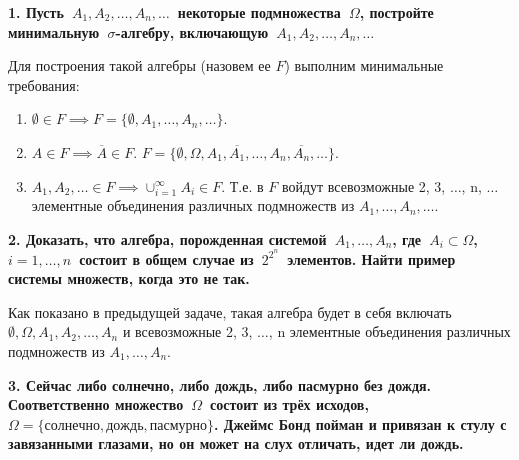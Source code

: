 \documentclass{article}
\begin{document}
\noindent \textbf{1. Пусть $A_1, A_2, \dots, A_n, \dots$ некоторые подмножества $\Omega$, постройте минимальную $\sigma$-алгебру, включающую $A_1, A_2, …, A_n, …$}

Для построения такой алгебры (назовем ее $F$) выполним минимальные требования:

\begin{enumerate}
\item $\emptyset \in F \implies F = \{\emptyset, A_1, \dots, A_n, \dots\}$. 

\item $A \in F \implies \overline{A} \in F$. $F = \{\emptyset, \Omega, A_1, \overline{A_1}, \dots, A_n, \overline{A_n}, \dots\}$. 

\item $A_1, A_2, \dots \in F \implies \cup_{i=1}^{\infty}A_i \in F$. Т.е. в $F$ войдут всевозможные 2, 3, $\dots$, n, $\dots$ элементные объединения различных подмножеств из $A_1, \dots, A_n, \dots$.
\end{enumerate}

\noindent \textbf{2. Доказать, что алгебра, порожденная системой $A_1, \dots, A_n$, где $A_i \subset \Omega$,  $i=1,\dots,n$ состоит в общем случае из $2^{2^n}$ элементов. Найти пример системы множеств, когда это не так.}

Как показано в предыдущей задаче, такая алгебра будет в себя включать $\emptyset, \Omega, A_1, A_2, \dots, A_n$ и всевозможные 2, 3, $\dots$, n элементные объединения различных подмножеств из $A_1, \dots, A_n$. 


\noindent \textbf{3. Сейчас либо солнечно, либо дождь, либо пасмурно без дождя. Соответственно множество $\Omega$ состоит из трёх исходов, $\Omega = \{солнечно, дождь, пасмурно\}$. Джеймс Бонд пойман и привязан к стулу с завязанными глазами, но он может на слух отличать, идет ли дождь.}
\end{document}
